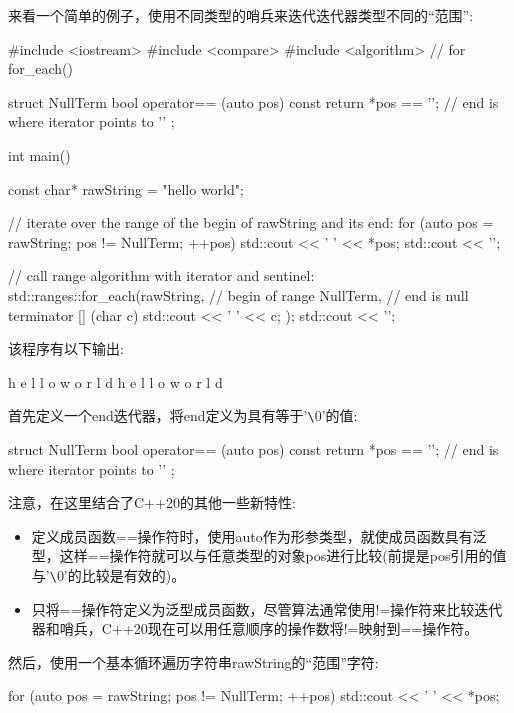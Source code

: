 来看一个简单的例子，使用不同类型的哨兵来迭代迭代器类型不同的“范围”:


\begin{cpp}
#include <iostream>
#include <compare>
#include <algorithm> // for for_each()

struct NullTerm {
	bool operator== (auto pos) const {
		return *pos == '\0'; // end is where iterator points to ’\0’
	}
};

int main()
{
	const char* rawString = "hello world";
	
	// iterate over the range of the begin of rawString and its end:
	for (auto pos = rawString; pos != NullTerm{}; ++pos) {
		std::cout << ' ' << *pos;
	}
	std::cout << '\n';
	
	// call range algorithm with iterator and sentinel:
	std::ranges::for_each(rawString, // begin of range
				NullTerm{}, // end is null terminator
				[] (char c) {
					std::cout << ' ' << c;
				});
	std::cout << '\n';
}
\end{cpp}

该程序有以下输出:

\begin{shell}
h e l l o   w o r l d
h e l l o   w o r l d
\end{shell}

首先定义一个end迭代器，将end定义为具有等于'\verb|\|0'的值:

\begin{cpp}
struct NullTerm {
	bool operator== (auto pos) const {
		return *pos == '\0'; // end is where iterator points to ’\0’
	}
};
\end{cpp}

注意，在这里结合了C++20的其他一些新特性:

\begin{itemize}
\item
定义成员函数==操作符时，使用auto作为形参类型，就使成员函数具有泛型，这样==操作符就可以与任意类型的对象pos进行比较(前提是pos引用的值与'\verb|\|0'的比较是有效的)。

\item
只将==操作符定义为泛型成员函数，尽管算法通常使用!=操作符来比较迭代器和哨兵，C++20现在可以用任意顺序的操作数将!=映射到==操作符。
\end{itemize}


然后，使用一个基本循环遍历字符串rawString的“范围”字符:

\begin{cpp}
for (auto pos = rawString; pos != NullTerm{}; ++pos) {
	std::cout << ' ' << *pos;
}
\end{cpp}

